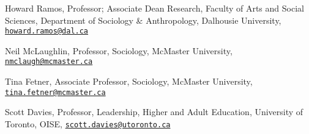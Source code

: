 \ind Howard Ramos, Professor; Associate Dean Research, Faculty of Arts
and Social Sciences, Department of Sociology \& Anthropology, Dalhousie
University,
\href{mailto:howard.ramos@dal.ca}{\nolinkurl{howard.ramos@dal.ca}}

\ind Neil McLaughlin, Professor, Sociology, McMaster University,
\href{mailto:nmclaugh@mcmaster.ca}{\nolinkurl{nmclaugh@mcmaster.ca}}

\ind Tina Fetner, Associate Professor, Sociology, McMaster University,
\href{mailto:tina.fetner@mcmaster.ca}{\nolinkurl{tina.fetner@mcmaster.ca}}

\ind Scott Davies, Professor, Leadership, Higher and Adult Education,
University of Toronto, OISE,
\href{mailto:scott.davies@utoronto.ca}{\nolinkurl{scott.davies@utoronto.ca}}
